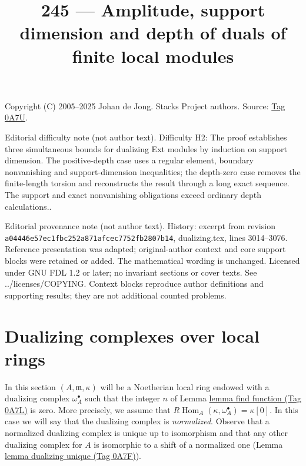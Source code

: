 \documentclass{amsart}
\theoremstyle{plain}
\theoremstyle{definition}
\theoremstyle{remark}
\numberwithin{equation}{subsection}
\def\Hom{\mathop{\mathrm{Hom}}\nolimits}
\begin{document}
\title[Stacks Project, Tag 0A7U]{245 --- Amplitude, support dimension and depth of duals of finite local modules}
\maketitle
\noindent Copyright (C) 2005--2025 Johan de Jong. Stacks Project authors. Source: \href{https://stacks.math.columbia.edu/tag/0A7U}{Tag 0A7U}.

\noindent Editorial difficulty note (not author text). Difficulty H2: The proof establishes three simultaneous bounds for dualizing Ext modules by induction on support dimension. The positive-depth case uses a regular element, boundary nonvanishing and support-dimension inequalities; the depth-zero case removes the finite-length torsion and reconstructs the result through a long exact sequence. The support and exact nonvanishing obligations exceed ordinary depth calculations..

\noindent Editorial provenance note (not author text). History: excerpt from revision \texttt{a0444\allowbreak 6e57e\allowbreak c1fbc\allowbreak 252a8\allowbreak 71afc\allowbreak ec775\allowbreak 2fb28\allowbreak 07b14}, dualizing.tex, lines 3014--3076. Reference presentation was adapted; original-author context and core support blocks were retained or added. The mathematical wording is unchanged. Licensed under GNU FDL 1.2 or later; no invariant sections or cover texts. See ../licenses/COPYING. Context blocks reproduce author definitions and supporting results; they are not additional counted problems.

\section{Dualizing complexes over local rings}
\label{section-dualizing-local}

\noindent
In this section $(A, \mathfrak m, \kappa)$ will be a Noetherian local
ring endowed with a dualizing complex $\omega_A^\bullet$ such that
the integer $n$ of Lemma \href{https://stacks.math.columbia.edu/tag/0A7L}{lemma find function (Tag 0A7L)} is zero.
More precisely, we assume that $R\Hom_A(\kappa, \omega_A^\bullet) = \kappa[0]$.
In this case we will say that the dualizing complex is {\it normalized}.
Observe that a normalized dualizing complex is unique up to
isomorphism and that any other dualizing complex for $A$ is isomorphic
to a shift of a normalized one (Lemma \href{https://stacks.math.columbia.edu/tag/0A7F}{lemma dualizing unique (Tag 0A7F)}).
\end{document}
